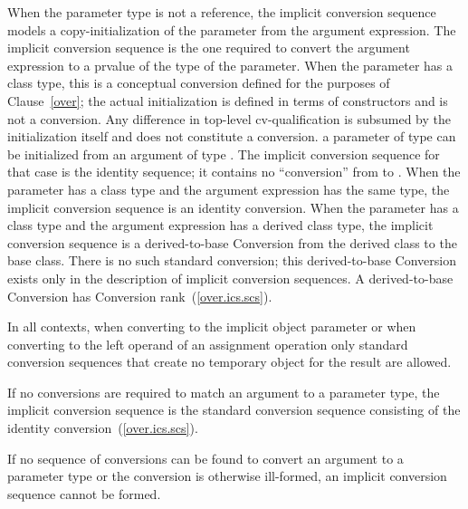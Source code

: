\pnum
When the parameter type is not a reference, the implicit conversion
sequence models a copy-initialization of the parameter from the argument
expression.
The implicit conversion sequence is the one required to convert the
argument expression to a prvalue of the type of
the parameter.
\enternote
When the parameter has a class type, this is a conceptual conversion
defined for the purposes of Clause~\ref{over}; the actual initialization is
defined in terms of constructors and is not a conversion.
\exitnote
Any difference in top-level cv-qualification is
subsumed by the initialization itself and does not constitute a conversion.
\enterexample
a parameter of type
can be initialized from an argument of type
.
The implicit conversion sequence for that case is the identity sequence; it
contains no ``conversion'' from
to
.
\exitexample
When the parameter has a class type and the argument expression has the
same type, the implicit conversion sequence is an identity conversion.
When the parameter has a class type and the argument expression has a
derived class type, the implicit conversion sequence is a
derived-to-base
%
Conversion from the derived class to the base class.
\enternote
There is no such standard conversion; this derived-to-base Conversion exists
only in the description of implicit conversion sequences.
\exitnote
A derived-to-base Conversion has Conversion rank~(\ref{over.ics.scs}).

\pnum
In all contexts, when converting to the implicit object parameter
or when converting to the left operand of an assignment operation
only standard conversion sequences that create no temporary
object for the result are allowed.

\pnum
If no conversions are required to match an argument to a
parameter type, the implicit conversion sequence is the standard
conversion sequence consisting of the identity conversion~(\ref{over.ics.scs}).

\pnum
If no sequence of conversions can be found to convert an argument
to a parameter type or the conversion is otherwise ill-formed, an
implicit conversion sequence cannot be formed.

